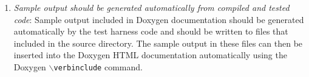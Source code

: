 \begin{enumerate}
{}\item\textit{Sample output should be generated automatically from compiled
and tested code}: Sample output included in Doxygen documentation should be
generated automatically by the test harness code and should be written to
files that included in the source directory.  The sample output in these files
can then be inserted into the Doxygen HTML documentation automatically using
the Doxygen {}\texttt{$\backslash$verbinclude} command.

\end{enumerate}
